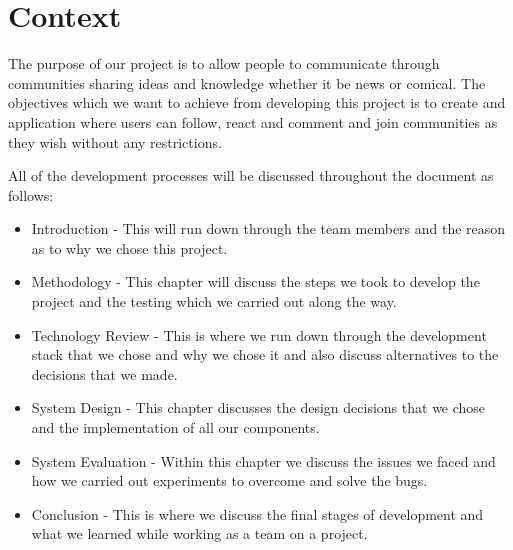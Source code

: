\chapter{Context}
The purpose of our project is to allow people to communicate through communities sharing ideas and knowledge whether it be news or comical. The objectives which we want to achieve from developing this project is to create and application where users can follow, react and comment and join communities as they wish without any restrictions.

All of the development processes will be discussed throughout the document as follows:

\begin{itemize}
\item Introduction - This will run down through the team members and the reason as to why we chose this project.

\item Methodology - This chapter will discuss the steps we took to develop the project and the testing which we carried out along the way.

\item Technology Review - This is where we run down through the development stack that we chose and why we chose it and also discuss alternatives to the decisions that we made. 

\item System Design - This chapter discusses the design decisions that we chose and the implementation of all our components.

\item System Evaluation - Within this chapter we discuss the issues we faced and how we carried out experiments to overcome and solve the bugs.

\item Conclusion - This is where we discuss the final stages of development and what we learned while working as a team on a project.
\end{itemize}

